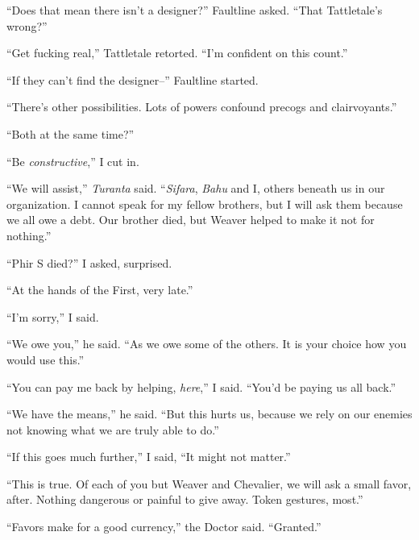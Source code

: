 ``Does that mean there isn't a designer?'' Faultline asked.  ``That Tattletale's wrong?''



``Get fucking real,'' Tattletale retorted.  ``I'm confident on this count.''



``If they can't find the designer--'' Faultline started.



``There's other possibilities.  Lots of powers confound precogs and clairvoyants.''



``Both at the same time?''



``Be \emph{constructive},'' I cut in.



``We will assist,'' \emph{Turanta} said.  ``\emph{Sifara}, \emph{Bahu} and I, others beneath us in our organization.  I cannot speak for my fellow brothers, but I will ask them because we all owe a debt.  Our brother died, but Weaver helped to make it not for nothing.''



``Phir S died?'' I asked, surprised.



``At the hands of the First, very late.''



``I'm sorry,'' I said.



``We owe you,'' he said.  ``As we owe some of the others.  It is your choice how you would use this.''



``You can pay me back by helping,\emph{ }\emph{here},'' I said.  ``You'd be paying us all back.''



``We have the means,'' he said. ``But this hurts us, because we rely on our enemies not knowing what we are truly able to do.''



``If this goes much further,'' I said, ``It might not matter.''



``This is true.  Of each of you but Weaver and Chevalier, we will ask a small favor, after.  Nothing dangerous or painful to give away.  Token gestures, most.''



``Favors make for a good currency,'' the Doctor said.  ``Granted.''



